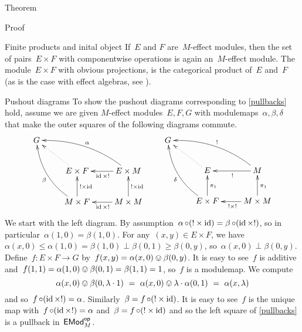 \documentclass[b]{subfiles}
\begin{document}
\begin{parsec}
\begin{point}{Theorem}
\begin{point}{Proof}
\begin{point}{Finite products and inital object}
If~$E$ and $F$ are~$M$-effect modules,
    then the set of pairs~$E \times F$
    with componentwise operations
    is again an~$M$-effect module.
The module~$E \times F$
    with obvious projections,
    is the categorical product of~$E$ and~$F$
    (as is the case with effect algebras, see ).
\end{point}
\begin{point}{Pushout diagrams}%
To show the pushout diagrams corresponding to \eqref{pullbacks} hold,
assume we are given $M$-effect modules~$E,F,G$
    with modulemaps~$\alpha,\beta,\delta$
    that make the  outer squares of the following diagrams commute.
\begin{equation*}
    \xymatrix{
    G\\
    & E \times F \ar@{.>}[lu]
    & E \times M \ar[l]^{\id\times !}
    \ar@/_1pc/[llu]_{\alpha}
    \\& M \times F \ar[u]_{! \times \id}
    \ar@/^1pc/[luu]^{\beta}
    & M \times M \ar[l]^{\id\times!} \ar[u]_{! \times \id}
    } \qquad
    \xymatrix{
    G\\
    & E \ar@{.>}[lu]
    & M \ar[l]^{!}
    \ar@/_1pc/[llu]_{!}
    \\& E \times F \ar[u]_{\pi_1}
    \ar@/^1pc/[luu]^{\delta}
    & M \times M \ar[l]^{!\times!} \ar[u]_{\pi_1}
    }
\end{equation*}
We start with the left diagram.
By assumption~$\alpha \mathop{\circ} (! \times \operatorname{id}) = \beta \mathop{\circ} (\operatorname{id} \times !)$,
    so in particular~$\alpha(1,0) = \beta(1,0)$.
    For any~$(x,y) \in E \times F$,
        we have~$\alpha(x,0) \leq \alpha(1,0) = \beta(1,0)
            \perp \beta(0,1) \geq \beta(0,y)$,
            so~$\alpha(x,0) \perp \beta(0,y)$.
Define~$f\colon E\times F \to G$
    by~$f(x,y) = \alpha(x,0) \ovee \beta(0,y)$.
It is easy to see~$f$ is additive
    and~$f(1,1) = \alpha(1,0) \ovee \beta(0,1) = \beta(1,1)=1$,
    so~$f$ is a modulemap.
We compute
\begin{equation*}
\alpha(x,0) \ovee \beta(0,\lambda \cdot 1)
\ = \ \alpha(x,0) \ovee \lambda \cdot \alpha(0, 1)
\ = \ \alpha(x,\lambda)
\end{equation*}
and so~$f \mathop{\circ} (\operatorname{id} \times !) = \alpha$.
Similarly~$\beta = f \mathop{\circ} (! \times \operatorname{id})$.
It is easy to see~$f$
is the unique map with~$f \mathop{\circ} (\operatorname{id} \times !) = \alpha$
and~$\beta = f \mathop{\circ} (! \times \operatorname{id})$
and so the left square of \eqref{pullbacks}
    is a pullback in~$\mathsf{EMod}_M^{\mathsf{op}}$.


\end{point}
\end{point}
\end{point}
\end{parsec}
\end{document}
